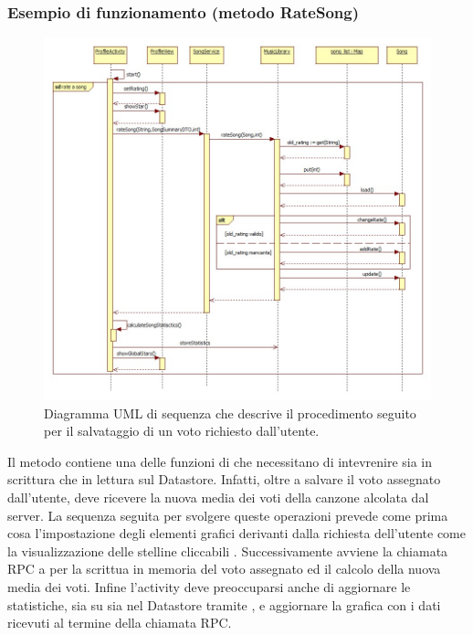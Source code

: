 \subsubsection*{Esempio di funzionamento (metodo RateSong)}
\begin{figure}[!h]
  \centering
  \includegraphics[width=17cm]{img/DP/rate_song.jpg}
\caption{Diagramma UML di sequenza che descrive il procedimento seguito per il
salvataggio di un voto richiesto dall'utente.}
\end{figure}
Il metodo  contiene una delle funzioni di
 che necessitano di intevrenire sia in scrittura che in
lettura sul Datastore. Infatti, oltre a salvare il voto assegnato dall'utente,
deve ricevere la nuova media dei voti della canzone alcolata dal server. La
sequenza seguita per svolgere queste operazioni prevede come prima cosa
l'impostazione degli elementi grafici derivanti dalla richiesta dell'utente come
la visualizzazione delle stelline cliccabili . Successivamente
avviene la chiamata RPC a  per la scrittua in memoria del voto
assegnato ed il calcolo della nuova media dei voti. Infine l'activity deve
preoccuparsi anche di aggiornare le statistiche, sia su  sia
nel Datastore tramite , e aggiornare la grafica con i dati
ricevuti al termine della chiamata RPC.
